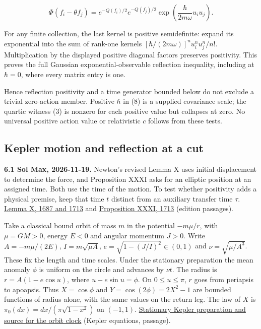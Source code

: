 \documentclass[11pt,a4paper]{article}
\begin{document}
\[
 \Phi(f_i-\theta f_j)
 =e^{-Q(f_i)/2}e^{-Q(f_j)/2}
       \exp\left(\frac{\hbar}{2m\omega}u_i u_j\right).
 \tag{9}
\]

For any finite collection, the last kernel is positive semidefinite:
expand its exponential into the sum of rank-one kernels
\([\hbar/(2m\omega)]^n u_i^n u_j^n/n!\). Multiplication by the displayed
positive diagonal factors preserves positivity. This proves the full
Gaussian exponential-observable reflection inequality, including at
\(\hbar=0\), where every matrix entry is one.

Hence reflection positivity and a time generator bounded below do not
exclude a trivial zero-action member. Positive \(\hbar\) in (8) is a
supplied covariance scale; the quartic witness (3) is nonzero for each
positive value but collapses at zero. No universal positive action value
or relativistic \(c\) follows from these tests.

\subsection{Kepler motion and reflection at a
cut}\label{kepler-motion-and-reflection-at-a-cut}

\textbf{6.1 Sol Max, 2026-11-19.} Newton's revised Lemma X uses initial
displacement to determine the force, and Proposition XXXI asks for an
elliptic position at an assigned time. Both use the time of the motion.
To test whether positivity adds a physical premise, keep that time \(t\)
distinct from an auxiliary transfer time \(\tau\).
\href{newton-insertion-action.md\#lemma-x-and-the-measurement-of-initial-force}{Lemma
X, 1687 and 1713} and
\href{../docs/Newton_Principia_Motte1846.md\#position-on-an-ellipse-at-an-assigned-time}{Proposition
XXXI, 1713} (edition passages).

Take a classical bound orbit of mass \(m\) in the potential \(-m\mu/r\),
with \(\mu=GM>0\), energy \(E<0\) and angular momentum \(J>0\). Write
\(A=-m\mu/(2E)\), \(I=m\sqrt{\mu A}\), \(e=\sqrt{1-(J/I)^2}\in(0,1)\)
and \(\nu=\sqrt{\mu/A^3}\). These fix the length and time scales. Under
the stationary preparation the mean anomaly \(\phi\) is uniform on the
circle and advances by \(\nu t\). The radius is \(r=A(1-e\cos u)\),
where \(u-e\sin u=\phi\). On \(0\le u\le\pi\), \(r\) goes from periapsis
to apoapsis. Thus \(X=\cos\phi\) and \(Y=\cos(2\phi)=2X^2-1\) are
bounded functions of radius alone, with the same values on the return
leg. The law of \(X\) is \(\pi_0(dx)=dx/(\pi\sqrt{1-x^2})\) on
\((-1,1)\).
\href{self-sufficiency-contrast.md\#stationary-kepler-preparations}{Stationary
Kepler preparation and source for the orbit clock} (Kepler equations,
passage).
\end{document}

